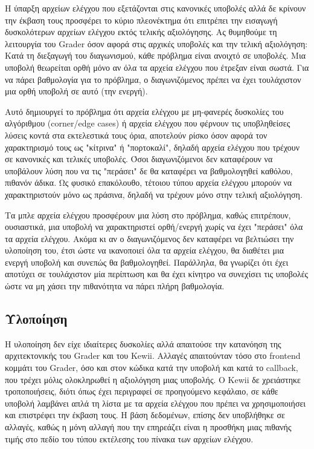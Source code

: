 \documentclass[diploma]{softlab-thesis}
\begin{document}
\bigskip

Η ύπαρξη αρχείων ελέγχου που εξετάζονται στις κανονικές υποβολές αλλά δε
κρίνουν την έκβαση τους προσφέρει το κύριο πλεονέκτημα ότι επιτρέπει την
εισαγωγή δυσκολότερων αρχείων ελέγχου εκτός τελικής αξιολόγησης. Ας θυμηθούμε
τη λειτουργία του Grader όσον αφορά στις αρχικές υποβολές και την τελική
αξιολόγηση: Κατά τη διεξαγωγή του διαγωνισμού, κάθε πρόβλημα είναι ανοιχτό σε
υποβολές. Μια υποβολή θεωρείται ορθή μόνο αν όλα τα αρχεία ελέγχου που έτρεξαν
είναι σωστά. Για να πάρει βαθμολογία για το πρόβλημα, ο διαγωνιζόμενος πρέπει
να έχει τουλάχιστον μια ορθή υποβολή σε αυτό (την ενεργή).

\bigskip

Αυτό δημιουργεί το πρόβλημα ότι αρχεία ελέγχου με μη-φανερές δυσκολίες του
αλγόριθμου (corner/edge cases) ή αρχεία ελέγχου που φέρνουν τις υποβληθείσες
λύσεις κοντά στα εκτελεστικά τους όρια, αποτελούν ρίσκο όσον αφορά τον
χαρακτηρισμό τους ως "κίτρινα" ή "πορτοκαλί", δηλαδή αρχεία ελέγχου που τρέχουν
σε κανονικές και τελικές υποβολές. Όσοι διαγωνιζόμενοι δεν καταφέρουν να
υποβάλουν λύση που να τις "περάσει" δε θα καταφέρει να βαθμολογηθεί καθόλου,
πιθανόν άδικα. Ως φυσικό επακόλουθο, τέτοιου τύπου αρχεία ελέγχου μπορούν να
χαρακτηριστούν μόνο ως πράσινα, δηλαδή να τρέχουν μόνο στην τελική αξιολόγηση.

\bigskip

Τα μπλε αρχεία ελέγχου προσφέρουν μια λύση στο πρόβλημα, καθώς επιτρέπουν,
ουσιαστικά, μια υποβολή να χαρακτηριστεί ορθή/ενεργή χωρίς να έχει "περάσει"
όλα τα αρχεία ελέγχου. Ακόμα κι αν ο διαγωνιζόμενος δεν καταφέρει να βελτιώσει
την υλοποίηση του, έτσι ώστε να ικανοποιεί όλα τα αρχεία ελέγχου, θα διαθέτει
μια ενεργή υποβολή και συνεπώς θα βαθμολογηθεί. Παράλληλα, θα γνωρίζει ότι
έχει αποτύχει σε τουλάχιστον μία περίπτωση και θα έχει κίνητρο να συνεχίσει τις
υποβολές ώστε να μη χάσει την πιθανότητα να πάρει πλήρη βαθμολογία.

\subsection{Υλοποίηση}

Η υλοποίηση δεν είχε ιδιαίτερες δυσκολίες αλλά απαιτούσε την κατανόηση της
αρχιτεκτονικής του Grader και του Kewii. Αλλαγές απαιτούνταν τόσο στο frontend
κομμάτι του Grader, όσο και στον κώδικα κατά την υποβολή και κατά το callback,
που τρέχει μόλις ολοκληρωθεί η αξιολόγηση μιας υποβολής. Ο Kewii δε χρειάστηκε
τροποποιήσεις, διότι όπως έχει περιγραφεί σε προηγούμενο κεφάλαιο, σε κάθε
υποβολή λαμβάνει απλά τη λίστα με τα αρχεία ελέγχου που πρέπει να
χρησιμοποιήσει και επιστρέφει την έκβαση τους. Η βάση δεδομένων, επίσης δεν
υποβλήθηκε σε αλλαγές, καθώς η μόνη αλλαγή που την επηρεάζει είναι η προσθήκη
μιας πιθανής τιμής στο πεδίο του τύπου εκτέλεσης του πίνακα των αρχείων
ελέγχου.
\end{document}
